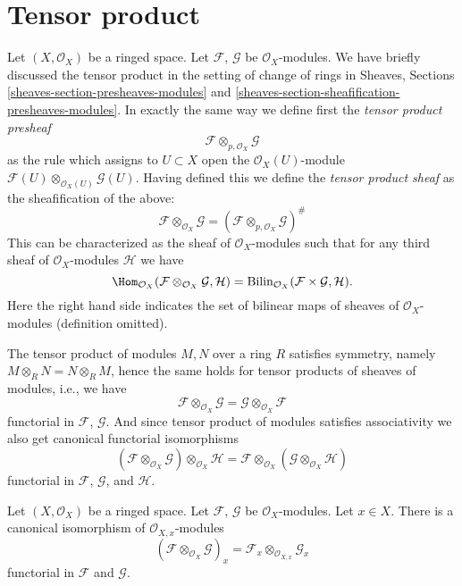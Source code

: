 \section{Tensor product}
\label{section-tensor-product}

\noindent
Let $(X, \mathcal{O}_X)$ be a ringed space.
Let $\mathcal{F}$, $\mathcal{G}$ be $\mathcal{O}_X$-modules.
We have briefly discussed the tensor product in the setting
of change of rings in Sheaves, Sections
\ref{sheaves-section-presheaves-modules} and
\ref{sheaves-section-sheafification-presheaves-modules}.
In exactly the same way we define first the {\it tensor
product presheaf}
$$
\mathcal{F} \otimes_{p, \mathcal{O}_X} \mathcal{G}
$$
as the rule which assigns to $U \subset X$ open the
$\mathcal{O}_X(U)$-module
$\mathcal{F}(U) \otimes_{\mathcal{O}_X(U)} \mathcal{G}(U)$.
Having defined this we define the {\it tensor product sheaf}
as the sheafification of the above:
$$
\mathcal{F} \otimes_{\mathcal{O}_X} \mathcal{G}
=
(\mathcal{F} \otimes_{p, \mathcal{O}_X} \mathcal{G})^\#
$$
This can be characterized as the sheaf of
$\mathcal{O}_X$-modules such that for any third
sheaf of $\mathcal{O}_X$-modules $\mathcal{H}$
we have
$$
\Hom_{\mathcal{O}_X}
(\mathcal{F} \otimes_{\mathcal{O}_X} \mathcal{G}, \mathcal{H})
=
\text{Bilin}_{\mathcal{O}_X}(\mathcal{F} \times \mathcal{G}, \mathcal{H}).
$$
Here the right hand side indicates the set of bilinear maps of sheaves
of $\mathcal{O}_X$-modules (definition omitted).

\medskip\noindent
The tensor product of modules $M, N$ over a ring $R$ satisfies symmetry,
namely $M \otimes_R N = N \otimes_R M$, hence the same holds for
tensor products of sheaves of modules, i.e., we have
$$
\mathcal{F} \otimes_{\mathcal{O}_X} \mathcal{G}
=
\mathcal{G} \otimes_{\mathcal{O}_X} \mathcal{F}
$$
functorial in $\mathcal{F}$, $\mathcal{G}$.
And since tensor product of modules satisfies associativity we
also get canonical functorial isomorphisms
$$
(\mathcal{F} \otimes_{\mathcal{O}_X} \mathcal{G})
\otimes_{\mathcal{O}_X} \mathcal{H}
=
\mathcal{F} \otimes_{\mathcal{O}_X}
(\mathcal{G} \otimes_{\mathcal{O}_X} \mathcal{H})
$$
functorial in $\mathcal{F}$, $\mathcal{G}$, and $\mathcal{H}$.

\begin{lemma}
\label{lemma-stalk-tensor-product}
Let $(X, \mathcal{O}_X)$ be a ringed space.
Let $\mathcal{F}$, $\mathcal{G}$ be $\mathcal{O}_X$-modules.
Let $x \in X$. There is a canonical isomorphism
of $\mathcal{O}_{X, x}$-modules
$$
(\mathcal{F} \otimes_{\mathcal{O}_X} \mathcal{G})_x
=
\mathcal{F}_x \otimes_{\mathcal{O}_{X, x}} \mathcal{G}_x
$$
functorial in $\mathcal{F}$ and $\mathcal{G}$.
\end{lemma}

